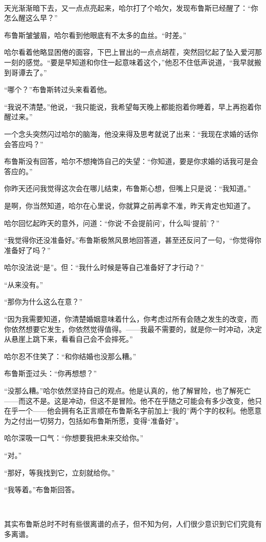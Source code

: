 \documentclass[../main]{subfiles}
\begin{document}
~\

天光渐渐暗下去，又一点点亮起来，哈尔打了个哈欠，发现布鲁斯已经醒了：“你怎么醒这么早？”

布鲁斯皱皱眉，哈尔看到他眼底有不太多的血丝。“时差。”

哈尔看着他略显困倦的面容，下巴上冒出的一点点胡茬，突然回忆起了坠入爱河那一刻的感觉。“要是早知道和你住一起意味着这个，”他忍不住低声说道，“我早就搬到哥谭去了。”

“哪个？”布鲁斯转过头来看着他。

“我说不清楚。”他说，“我只能说，我希望每天晚上都能抱着你睡着，早上再抱着你醒过来。”

一个念头突然闪过哈尔的脑海，他没来得及思考就说了出来：“我现在求婚的话你会答应吗？”

布鲁斯没有回答，哈尔不想掩饰自己的失望：“你知道，要是你求婚的话我可是会答应的。”

你昨天还问我觉得这次会在哪儿结束，布鲁斯心想，但嘴上只是说：“我知道。”

是啊，你当然知道，哈尔在心里说，你就算之前再拿不准，昨天肯定也知道了。

哈尔回忆起昨天的意外，问道：“你说‘不会提前问’，什么叫‘提前’？”

“我觉得你还没准备好。”布鲁斯极煞风景地回答道，甚至还反问了一句，“你觉得你准备好了吗？”

哈尔没法说“是”。但：“我什么时候是等自己准备好了才行动？”

“从来没有。”

“那你为什么这么在意？”

“因为我需要知道，你清楚婚姻意味着什么，你考虑过所有会随之发生的改变，而你依然想要它发生，你依然觉得值得。——我最不需要的，就是你一时冲动，决定从悬崖上跳下来，看看自己会不会摔死。”

哈尔忍不住笑了：“和你结婚也没那么糟。”

布鲁斯歪过头：“你再想想？”

“没那么糟。”哈尔依然坚持自己的观点。他是认真的，他了解冒险，也了解死亡——而这不是。这是冲动，但这不是冒险。他不在乎随之可能会有多少改变，他只在乎一个——他会拥有名正言顺在布鲁斯名字前加上“我的”两个字的权利。他愿意为之付出一切努力，包括如布鲁斯所愿，变得“准备好”。

哈尔深吸一口气：“你想要我把未来交给你。”

“对。”

“那好，等我找到它，立刻就给你。”

“我等着。”布鲁斯回答。

~\

其实布鲁斯总时不时有些很离谱的点子，但不知为何，人们很少意识到它们究竟有多离谱。
\end{document}
